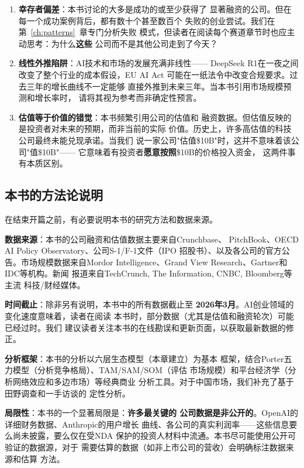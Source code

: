 \begin{warnbox}[阅读本书时需要警惕的三个认知陷阱]
\begin{enumerate}
  \item \textbf{幸存者偏差}：本书讨论的大多是成功的或至少获得了
    显著融资的公司。但在每一个成功案例背后，都有数十个甚至数百个
    失败的创业尝试。我们在第~\ref{ch:patterns}~章专门分析失败
    模式，但读者在阅读每个赛道章节时也应主动思考：为什么\textbf{这些}
    公司而不是其他公司走到了今天？
  \item \textbf{线性外推陷阱}：AI技术和市场的发展充满非线性——
    DeepSeek R1在一夜之间改变了整个行业的成本假设，EU AI Act
    可能在一纸法令中改变合规要求。过去三年的增长曲线不一定能够
    直接外推到未来三年。当本书引用市场规模预测和增长率时，
    请将其视为参考而非确定性预言。
  \item \textbf{估值等于价值的错觉}：本书频繁引用公司的估值和
    融资数据。但估值反映的是投资者对未来的预期，而非当前的实际
    价值。历史上，许多高估值的科技公司最终未能兑现承诺。当我们
    说一家公司"估值\$10B"时，这并不意味着该公司"值\$10B"——
    它意味着有投资者\textbf{愿意按照}\$10B的价格投入资金，
    这两件事有本质区别。
\end{enumerate}
\end{warnbox}

\subsection{本书的方法论说明}

在结束开篇之前，有必要说明本书的研究方法和数据来源。

\textbf{数据来源}：本书的公司融资和估值数据主要来自Crunchbase、
PitchBook、OECD AI Policy Observatory、公司S-1/F-1文件（IPO
招股书）、以及各公司的官方公告。市场规模数据来自Mordor
Intelligence、Grand View Research、Gartner和IDC等机构。新闻
报道来自TechCrunch, The Information, CNBC, Bloomberg等主流
科技/财经媒体。

\textbf{时间截止}：除非另有说明，本书中的所有数据截止至
\textbf{2026年3月}。AI创业领域的变化速度意味着，读者在阅读
本书时，部分数据（尤其是估值和融资轮次）可能已经过时。我们
建议读者关注本书的在线勘误和更新页面，以获取最新数据的修正。

\textbf{分析框架}：本书的分析以六层生态模型（本章建立）为基本
框架，结合Porter五力模型（分析竞争格局）、TAM/SAM/SOM（评估
市场规模）和平台经济学（分析网络效应和多边市场）等经典商业
分析工具。对于中国市场，我们补充了基于田野调查和一手访谈的
定性分析。

\textbf{局限性}：本书的一个显著局限是：\textbf{许多最关键的
公司数据是非公开的}。OpenAI的详细财务数据、Anthropic的用户增长
曲线、各公司的真实利润率——这些信息要么尚未披露，要么仅在受NDA
保护的投资人材料中流通。本书尽可能使用公开可验证的数据源，对于
需要估算的数据（如非上市公司的营收）会明确标注数据来源和估算
方法。

